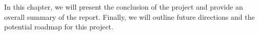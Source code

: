 In this chapter, we will present the conclusion of the project and provide an overall summary of the report. Finally, we will outline future directions and the potential roadmap for this project.